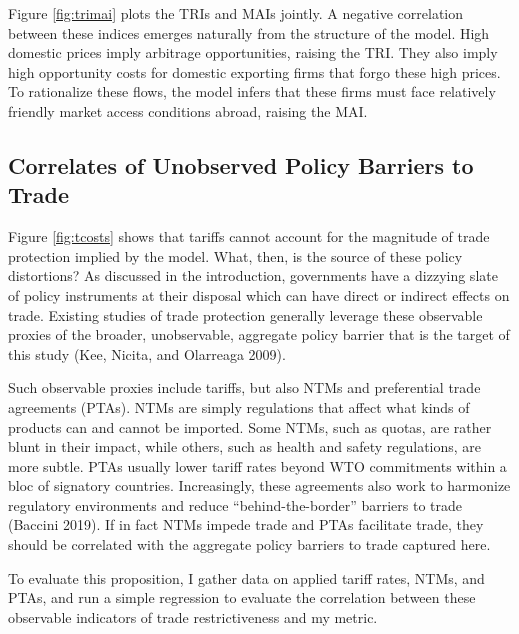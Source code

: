 \documentclass{puthesis}
\begin{document}
Figure \ref{fig:trimai} plots the TRIs and MAIs jointly. A negative
correlation between these indices emerges naturally from the structure
of the model. High domestic prices imply arbitrage opportunities,
raising the TRI. They also imply high opportunity costs for domestic
exporting firms that forgo these high prices. To rationalize these
flows, the model infers that these firms must face relatively friendly
market access conditions abroad, raising the MAI.

\subsection{Correlates of Unobserved Policy Barriers to Trade}

Figure \ref{fig:tcosts} shows that tariffs cannot account for the
magnitude of trade protection implied by the model. What, then, is the
source of these policy distortions? As discussed in the introduction,
governments have a dizzying slate of policy instruments at their
disposal which can have direct or indirect effects on trade. Existing
studies of trade protection generally leverage these observable proxies
of the broader, unobservable, aggregate policy barrier that is the
target of this study (Kee, Nicita, and Olarreaga 2009).

Such observable proxies include tariffs, but also NTMs and preferential
trade agreements (PTAs). NTMs are simply regulations that affect what
kinds of products can and cannot be imported. Some NTMs, such as quotas,
are rather blunt in their impact, while others, such as health and
safety regulations, are more subtle. PTAs usually lower tariff rates
beyond WTO commitments within a bloc of signatory countries.
Increasingly, these agreements also work to harmonize regulatory
environments and reduce ``behind-the-border'' barriers to trade (Baccini
2019). If in fact NTMs impede trade and PTAs facilitate trade, they
should be correlated with the aggregate policy barriers to trade
captured here.

To evaluate this proposition, I gather data on applied tariff rates,
NTMs, and PTAs, and run a simple regression to evaluate the correlation
between these observable indicators of trade restrictiveness and my
metric.
\end{document}
